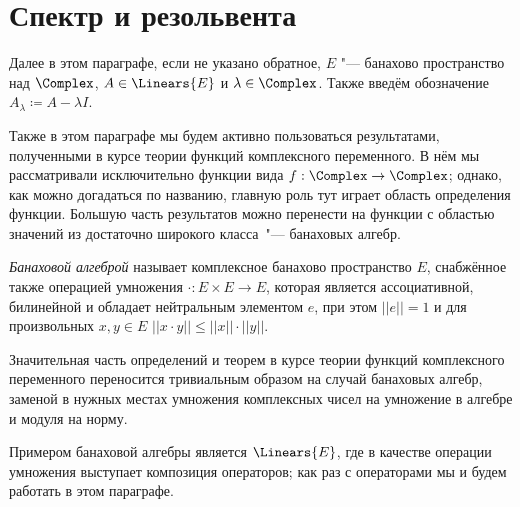 \documentclass[main]{subfiles}
\begin{document}
\section{Спектр и резольвента} %
%

Далее в этом параграфе,
если не указано обратное,
\( E \) "--- банахово пространство над \( \Complex \),
\( A \in \Linears{E} \) и \( \lambda \in \Complex \).
Также введём обозначение \( A_\lambda \coloneqq A - \lambda I \).

Также в этом параграфе мы будем активно
пользоваться результатами,
полученными в курсе
теории функций комплексного переменного.
В нём мы рассматривали
исключительно функции
вида \( f : \Complex \to \Complex \);
однако, как можно догадаться по названию,
главную роль тут играет область определения функции.
Большую часть результатов можно перенести
на функции с областью значений из достаточно
широкого класса~"--- банаховых алгебр.

\begin{definition}
  \emph{Банаховой алгеброй}
  называет комплексное банахово пространство \( E \),
  снабжённое также операцией умножения
  \( \cdot : E \times E \to E \),
  которая является 
  ассоциативной, билинейной и
  обладает нейтральным элементом \( e \),
  при этом \( ||e|| = 1 \)
  и для произвольных \( x, y \in E \)
  \( ||x \cdot y|| \le ||x|| \cdot ||y|| \).
\end{definition}

Значительная часть определений и теорем в курсе теории функций комплексного переменного
переносится тривиальным образом на случай
банаховых алгебр, заменой в нужных местах
умножения комплексных чисел на умножение в алгебре
и модуля на норму.

Примером банаховой алгебры является
\( \Linears{E} \), где в качестве операции
умножения выступает композиция операторов;
как раз с операторами мы и будем работать в этом параграфе.

%
\end{document}
